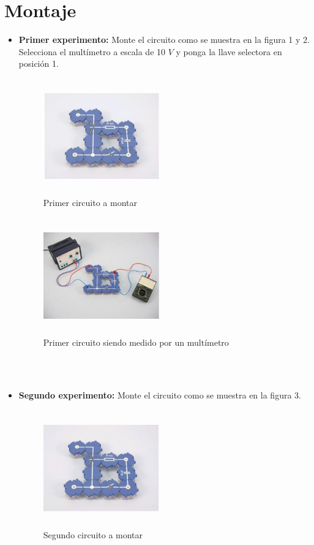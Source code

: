 \section{Montaje}
\begin{itemize}
	\renewcommand{\theenumi}{\Alph{enumi}}
	\item \textbf{ Primer experimento:} Monte el circuito como se muestra en la figura 1 y 2. Selecciona el multímetro a escala de 10 $V$ y ponga la llave selectora en posición 1.
	\begin{figure}[h]
		\centering
		\includegraphics[width=5cm, height= 5cm]{imagenes/figura1}
		\caption{Primer circuito a montar}
	\end{figure}
	\begin{figure}[h]
		\centering
		\includegraphics[width=5cm, height=5cm]{imagenes/figura2}
		\caption{Primer circuito siendo medido por un multímetro}
	\end{figure}
	\\
	\\
	\item \textbf{Segundo experimento:} Monte el circuito como se muestra  en la figura 3.
	\begin{figure}[h]
		\centering
		\includegraphics[width=5cm, height=5cm]{imagenes/figura3}
		\caption{Segundo circuito a montar}
	\end{figure}
\end{itemize}

